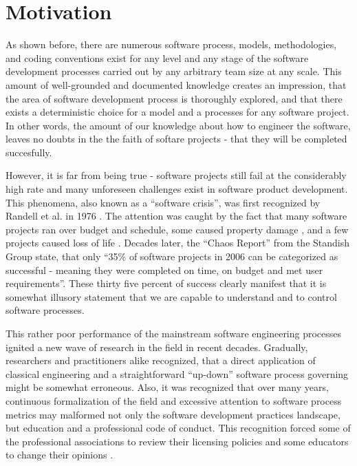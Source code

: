 \section{Motivation}
As shown before, there are numerous software process, models, methodologies, and 
coding conventions exist for any level and any stage of the software development 
processes carried out by any arbitrary team size at any scale. 
This amount of well-grounded and documented knowledge creates an impression, 
that the area of software development process is thoroughly explored, 
and that there exists a deterministic choice for a model and a 
processes for any software project. 
In other words, the amount of our knowledge about how to engineer the software, 
leaves no doubts in the the faith of softare projects - that they will be completed 
succesfully. 

However, it is far from being true - software projects still fail at the considerably 
high rate and many unforeseen challenges exist in software product development.
This phenomena, also known as a ``software crisis'', was first recognized by Randell et al. in 1976 
\cite{naur1976software}. The attention was caught by the fact that many software projects ran 
over budget and schedule, some caused property damage \cite{citeulike:11044022}, and a few projects caused 
loss of life \cite{citeulike:712058}. Decades later, the ``Chaos Report'' from the Standish 
Group \cite{SDTimes} state, that only ``35\% of software projects in 2006 can 
be categorized as successful - meaning they were completed on time, on budget and met 
user requirements''. These thirty five percent of success clearly manifest that it is somewhat 
illusory statement that we are capable to understand and to control software processes.

This rather poor performance of the mainstream software engineering processes 
ignited a new wave of research in the field in recent decades. Gradually, researchers and 
practitioners alike recognized, that a direct application of classical engineering and a 
straightforward ``up-down'' software process governing might be somewhat erroneous. 
Also, it was recognized that over many years, continuous formalization of the field and 
excessive attention to software process metrics may malformed not only the software development 
practices landscape, but education and a professional code of conduct. 
This recognition forced some of the professional associations 
to review their licensing policies \cite{citeulike:11045517} and some educators to change their 
opinions \cite{citeulike:5203446}. 

